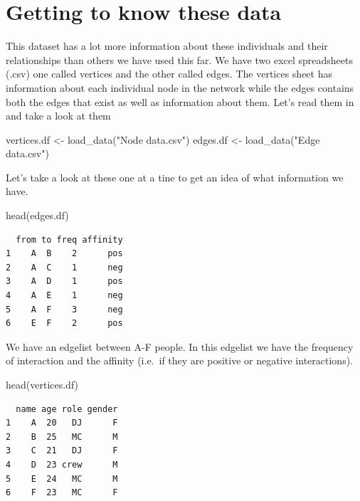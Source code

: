 \documentclass[
  letterpaper,
  DIV=11,
  numbers=noendperiod]{scrreprt}
\newenvironment{Shaded}{\begin{snugshade}}{\end{snugshade}}
\newcommand{\FunctionTok}[1]{\textcolor[rgb]{0.28,0.35,0.67}{#1}}
\newcommand{\NormalTok}[1]{\textcolor[rgb]{0.00,0.23,0.31}{#1}}
\newcommand{\OtherTok}[1]{\textcolor[rgb]{0.00,0.23,0.31}{#1}}
\newcommand{\StringTok}[1]{\textcolor[rgb]{0.13,0.47,0.30}{#1}}
\begin{document}
\section{Getting to know these data}\label{getting-to-know-these-data}

This dataset has a lot more information about these individuals and
their relationships than others we have used this far. We have two excel
spreadsheets (.csv) one called vertices and the other called edges. The
vertices sheet has information about each individual node in the network
while the edges contains both the edges that exist as well as
information about them. Let's read them in and take a look at them

\begin{Shaded}
\begin{Highlighting}[]
\NormalTok{vertices.df }\OtherTok{\textless{}{-}} \FunctionTok{load\_data}\NormalTok{(}\StringTok{"Node data.csv"}\NormalTok{)}
\NormalTok{edges.df }\OtherTok{\textless{}{-}} \FunctionTok{load\_data}\NormalTok{(}\StringTok{"Edge data.csv"}\NormalTok{)}
\end{Highlighting}
\end{Shaded}

Let's take a look at these one at a tine to get an idea of what
information we have.

\begin{Shaded}
\begin{Highlighting}[]
\FunctionTok{head}\NormalTok{(edges.df)}
\end{Highlighting}
\end{Shaded}

\begin{verbatim}
  from to freq affinity
1    A  B    2      pos
2    A  C    1      neg
3    A  D    1      pos
4    A  E    1      neg
5    A  F    3      neg
6    E  F    2      pos
\end{verbatim}

We have an edgelist between A-F people. In this edgelist we have the
frequency of interaction and the affinity (i.e.~if they are positive or
negative interactions).

\begin{Shaded}
\begin{Highlighting}[]
\FunctionTok{head}\NormalTok{(vertices.df)}
\end{Highlighting}
\end{Shaded}

\begin{verbatim}
  name age role gender
1    A  20   DJ      F
2    B  25   MC      M
3    C  21   DJ      F
4    D  23 crew      M
5    E  24   MC      M
6    F  23   MC      F
\end{verbatim}
\end{document}

